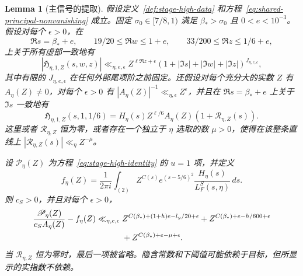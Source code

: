 \documentclass[11pt,a4paper]{article}
\numberwithin{equation}{section}
\numberwithin{figure}{section}
\newtheorem{lemma}[theorem]{Lemma}
\theoremstyle{definition}
\theoremstyle{remark}
\begin{document}
\begin{lemma}[主信号的提取]
\label{lem:principal-residue-interface}
假设定义~\ref{def:stage-high-data} 和方程~\eqref{eq:shared-principal-nonvanishing} 成立。固定 $\sigma_0\in[7/8,1)$ 满足 $\beta_*>\sigma_0$ 且 $0<e<10^{-3}$。假设对每个 $\epsilon>0$，在
\[
 \Re s=\beta_*+e,\qquad 19/20\le\Re w\le1+e,
 \qquad 33/200\le\Re z\le1/6+e,
\]
上关于所有虚部一致地有
\begin{equation}
 |\mathfrak H_{\eta,1,Z}(s,w,z)|
 \ll_{\eta,e,\epsilon} Z^{\ell\Re z+\epsilon}
  (1+|\Im s|+|\Im w|+|\Im z|)^{J_{\eta,e,\epsilon}},
 \label{eq:principal-correction-bound}
\end{equation}
其中有限的 $J_{\eta,e,\epsilon}$ 在任何外部尾项阶之前固定。还假设对每个充分大的实数 $Z$ 有 $A_\eta(Z)\ne0$，对每个 $\epsilon>0$ 有 $|A_\eta(Z)|^{-1}\ll_{\eta,\epsilon}Z^\epsilon$，并且在 $\Re s=\beta_*+e$ 上关于 $\Im s$ 一致地有
\begin{equation}
 \mathfrak H_{\eta,1,Z}(s,1,1/6)
 =H_\eta(s)Z^{\ell/6}A_\eta(Z)(1+\mathcal R_{\eta,Z}(s)).
 \label{eq:principal-correction-residue}
\end{equation}
这里或者 $\mathcal R_{\eta,Z}$ 恒为零，或者存在一个独立于 $\eta$ 选取的数 $\mu>0$，使得在该整条直线上 $|\mathcal R_{\eta,Z}(s)|\ll_\eta Z^{-\mu}$。

设 $\mathscr P_\eta(Z)$ 为方程~\eqref{eq:stage-high-identity} 的 $u=1$ 项，并定义
\[
 f_\eta(Z)=\frac1{2\pi i}\int_{(2)}
    Z^{C(s)}e^{(s-5/6)^2}\frac{H_\eta(s)}{L_F^S(s,\eta)}\,ds.
\]
则 $c_S>0$，并且对每个 $\epsilon>0$，
\begin{align}
 \frac{\mathscr P_\eta(Z)}{c_SA_\eta(Z)}-f_\eta(Z)
 \ll_{\eta,e,\epsilon}{}&
 Z^{C(\beta_*)+(1+h)e-l_y/20+\epsilon}
 +Z^{C(\beta_*)+e-h/600+\epsilon}\notag\\
 &+Z^{C(\beta_*)+e-\mu+\epsilon}.
 \label{eq:principal-remainder-bound}
\end{align}
当 $\mathcal R_{\eta,Z}$ 恒为零时，最后一项被省略。隐含常数和下阈值可能依赖于目标，但所显示的实指数不依赖。
\end{lemma}
\end{document}
